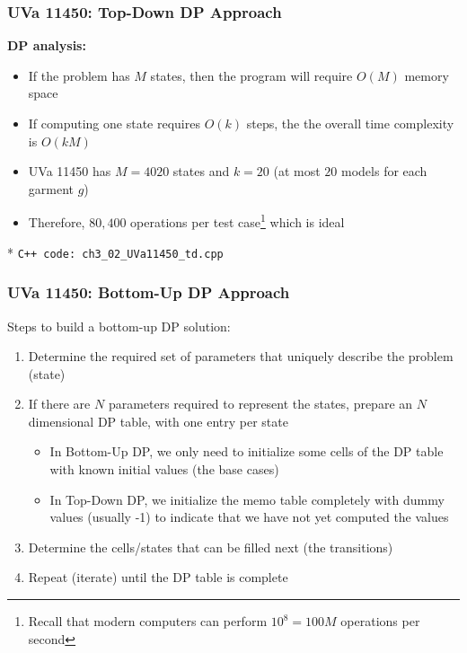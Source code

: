 \documentclass{beamer}
\begin{document}
\begin{frame}[fragile]
\frametitle{UVa 11450: Top-Down DP Approach}

\textbf{DP analysis: }
\begin{itemize}
    \item If the problem has $M$ states, then the program will require $O(M)$ memory space
    \item If computing one state requires $O(k)$ steps, the the overall time complexity is $O(kM)$
    \item \color{red}UVa 11450 \color{black} has $M=4020$ states and $k=20$ (at most $20$ models for each garment $g$)
    \item Therefore, $80,400$ operations per test case\footnote{Recall that modern computers can perform $10^8 = 100M$ operations per second} which is ideal
\end{itemize}

\vspace{0.3cm}

\color{red}* \verb|C++ code: ch3_02_UVa11450_td.cpp| \color{black}

\end{frame}


\begin{frame}[fragile]
\frametitle{UVa 11450: Bottom-Up DP Approach}

Steps to build a bottom-up DP solution:

\begin{enumerate}
    \item Determine the required set of parameters that uniquely describe the problem (state)
	\pause
	\item If there are $N$ parameters required to represent the states, prepare an $N$ dimensional DP table, with one entry per state
		\begin{itemize}
		    \item In Bottom-Up DP, we only need to initialize some cells of the DP table with known initial values (the base cases)
		    \item In Top-Down DP, we initialize the memo table completely with dummy values (usually -1) to indicate that we have not yet computed the values
		\end{itemize}
	\pause
	\item Determine the cells/states that can be filled next (the transitions)
	\item Repeat (iterate) until the DP table is complete
\end{enumerate}

\end{frame}
\end{document}
